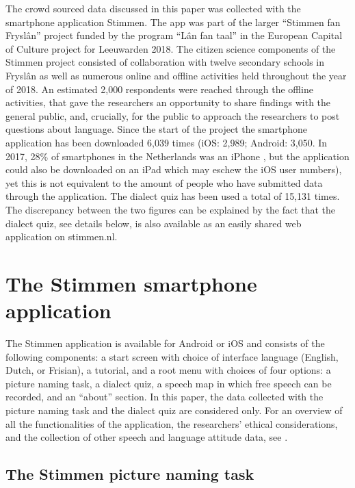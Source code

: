 \documentclass[output=paper,hidelinks]{langscibook}
\begin{document}
The crowd sourced data discussed in this paper was collected with the smartphone application Stimmen. The app was part of the larger “Stimmen fan Fryslân” project funded by the program ``Lân fan taal'' in the European Capital of Culture project for Leeuwarden 2018. The citizen science components of the Stimmen project consisted of collaboration with twelve secondary schools in Fryslân as well as numerous online and offline activities held throughout the year of 2018. An estimated 2,000 respondents were reached through the offline activities, that gave the researchers an opportunity to share findings with the general public, and, crucially, for the public to approach the researchers to post questions about language. Since the start of the project the smartphone application has been downloaded 6,039 times (iOS: 2,989; Android: 3,050. In 2017, 28\% of smartphones in the Netherlands was an iPhone \citep{steemers2017deloitte}, but the application could also be downloaded on an iPad which may eschew the iOS user numbers), yet this is not equivalent to the amount of people who have submitted data through the application. The dialect quiz has been used a total of 15,131 times. The discrepancy between the two figures can be explained by the fact that the dialect quiz, see details below, is also available as an easily shared web application on stimmen.nl.

\section{The Stimmen smartphone application}

The Stimmen application is available for Android or iOS and consists of the following components: a start screen with choice of interface language (English, Dutch, or Frisian), a tutorial, and a root menu with choices of four options: a picture naming task, a dialect quiz, a speech map in which free speech can be recorded, and an ``about'' section. In this paper, the data collected with the picture naming task and the dialect quiz are considered only. For an overview of all the functionalities of the application, the researchers’ ethical considerations, and the collection of other speech and language attitude data, see \citet{hilton2021stimmen}.

\subsection{The Stimmen picture naming task}
\label{subsect:picturenamingtask}
\end{document}
